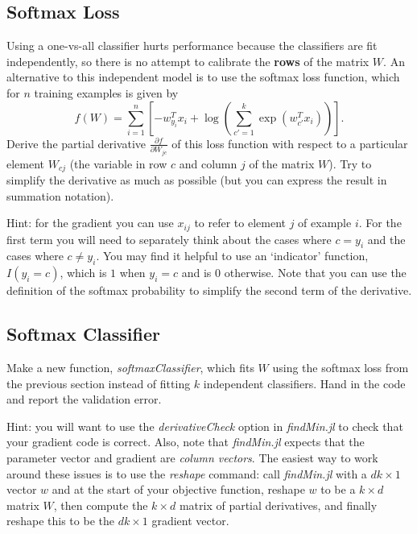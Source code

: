 \documentclass{article}
\def\blu#1{{\color{blu}#1}}
\begin{document}
\pagebreak

\subsection{Softmax Loss}

Using a one-vs-all classifier hurts performance because the classifiers are fit independently, so there is no attempt to calibrate the \textbf{rows} of the matrix $W$. An alternative to this independent model is to use the softmax loss function, which for $n$ training examples is given by
\[
f(W) = \sum_{i=1}^n \left[-w_{y_i}^Tx_i + \log\left(\sum_{c' = 1}^k \exp(w_{c'}^Tx_i)\right)\right].
\]
\blu{Derive the partial derivative $\frac{\partial f}{\partial W_{jc}}$ of this loss function with respect to a particular element $W_{cj}$ (the variable in row $c$ and column $j$ of the matrix $W$)}. Try to simplify the derivative as much as possible (but you can express the result in summation notation).

Hint: for the gradient you can use $x_{ij}$ to refer to element $j$ of example $i$. For the first term you will need to separately think about the cases where $c=y_i$ and the cases where $c\neq y_i$. You may find it helpful to use an `indicator' function, $I(y_i = c)$, which is $1$ when $y_i = c$ and is $0$ otherwise. Note that you can use the definition of the softmax probability to simplify the second term of the derivative.


\pagebreak

\subsection{Softmax Classifier}

Make a new function, \emph{softmaxClassifier}, which fits $W$ using the softmax loss from the previous section  instead of fitting $k$ independent classifiers. \blu{Hand in the code and report the validation error}.

Hint: you will want to use the \emph{derivativeCheck} option in \emph{findMin.jl} to check that your gradient code is correct. Also, note that \emph{findMin.jl} expects that the parameter vector and gradient are \emph{column vectors}. The easiest way to work around these issues is to use the \emph{reshape} command: call \emph{findMin.jl} with a $dk \times 1$ vector $w$ and at the start of your objective function, reshape $w$ to be a $k \times d$ matrix $W$, then compute the $k \times d$ matrix of partial derivatives, and finally reshape this to be the $dk \times 1$ gradient vector.
\end{document}
